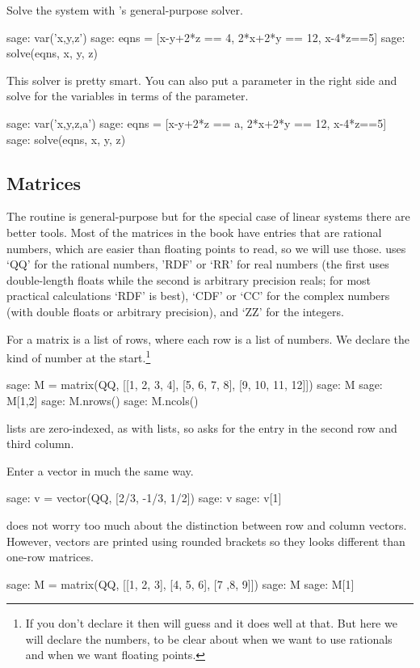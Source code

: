 Solve the system with \Sage's general-purpose solver.
\begin{sagecommandline}
sage: var('x,y,z')                                  
sage: eqns = [x-y+2*z == 4, 2*x+2*y == 12, x-4*z==5]
sage: solve(eqns, x, y, z)                            
\end{sagecommandline}
This solver is pretty smart.
You can also put a parameter in the right side and solve for the variables
in terms of the parameter.
\begin{sagecommandline}
sage: var('x,y,z,a')                                
sage: eqns = [x-y+2*z == a, 2*x+2*y == 12, x-4*z==5]
sage: solve(eqns, x, y, z) 
\end{sagecommandline}



\subsection{Matrices}
The  routine is general-purpose but 
for the special case of linear systems there are better tools.
Most of the matrices in the book
have entries that are rational numbers, which are
easier than floating points to read, so we will use those.
\Sage{} uses `QQ' for the rational numbers,
'RDF' or `RR' for real numbers (the first uses double-length floats 
while the second is arbitrary precision reals; 
for most practical calculations `RDF' is best),
`CDF'  or `CC' for the complex numbers (with double floats
or arbitrary precision),
and
`ZZ' for the integers.

For \Sage{} a matrix is a list of rows, where
each row is a list of numbers. 
We declare the kind of number at the start.\footnote{%
  If you don't declare it then \protect\Sage{} will guess
  and it does well at that.
  But here we will declare the numbers, to 
  be clear about when we want to use rationals and when
  we want floating points.}
\begin{sagecommandline}
sage: M = matrix(QQ, [[1, 2, 3, 4], [5, 6, 7, 8], [9, 10, 11, 12]])
sage: M
sage: M[1,2]
sage: M.nrows()
sage: M.ncols()
\end{sagecommandline}
\noindent
\Sage{} lists are zero-indexed, as with \python{} lists, 
so  asks
for the entry in the second row and third column. 

Enter a vector in much the same way.
\begin{sagecommandline}
sage: v = vector(QQ, [2/3, -1/3, 1/2])
sage: v
sage: v[1]
\end{sagecommandline}
\noindent
\Sage{} does not worry too much about the distinction between row and column
vectors.
However, vectors
are printed using rounded brackets so  
they looks different than one-row matrices.
\begin{sagecommandline}
sage: M = matrix(QQ, [[1, 2, 3], [4, 5, 6], [7 ,8, 9]])
sage: M
sage: M[1]
\end{sagecommandline}

